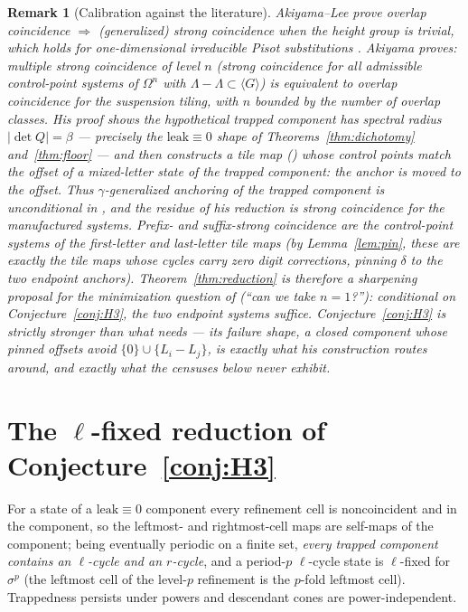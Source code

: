 \documentclass[11pt]{article}
\newtheorem{remark}[theorem]{Remark}
\begin{document}
\begin{remark}[Calibration against the literature]\label{rem:calib}
Akiyama--Lee \cite{AL14} prove overlap coincidence $\Rightarrow$
(generalized) strong coincidence when the height group is trivial,
which holds for one-dimensional irreducible Pisot substitutions
\cite{BK06,Sing06}. Akiyama \cite[Thm.~3.2, Cor.~3.3]{Ak16} proves:
\emph{multiple strong coincidence of level $n$} (strong coincidence for
all admissible control-point systems of $\Omega^n$ with
$\Lambda-\Lambda\subset\langle G\rangle$) is equivalent to overlap
coincidence for the suspension tiling, with $n$ bounded by the number
of overlap classes. His proof shows the hypothetical trapped component
has spectral radius $|\det Q|=\beta$ --- precisely the
$\mathrm{leak}\equiv0$ shape of Theorems~\ref{thm:dichotomy}
and~\ref{thm:floor} --- and then \emph{constructs} a tile map
(\cite[Lem.~3.5]{Ak16}) whose control points match the offset of a
mixed-letter state of the trapped component: the anchor is moved to
the offset. Thus $\gamma$-generalized anchoring of the trapped
component is unconditional in \cite{Ak16}, and the residue of his
reduction is strong coincidence for the manufactured systems.
Prefix- and suffix-strong coincidence are the control-point systems of
the first-letter and last-letter tile maps (by
Lemma~\ref{lem:pin}, these are exactly the tile maps whose cycles carry
zero digit corrections, pinning $\delta$ to the two endpoint anchors).
Theorem~\ref{thm:reduction} is therefore a sharpening proposal for the
minimization question of \cite[Rem.~3.4]{Ak16} (``can we take
$n=1$?''): conditional on Conjecture~\ref{conj:H3}, the two endpoint
systems suffice. Conjecture~\ref{conj:H3} is strictly stronger than
what \cite{Ak16} needs --- its failure shape, a closed component whose
pinned offsets avoid $\{0\}\cup\{L_i-L_j\}$, is exactly what his
construction routes around, and exactly what the censuses below never
exhibit.
\end{remark}

\section{The $\ell$-fixed reduction of Conjecture~\ref{conj:H3}}

For a state of a $\mathrm{leak}\equiv0$ component every refinement cell
is noncoincident and in the component, so the leftmost- and
rightmost-cell maps are self-maps of the component; being eventually
periodic on a finite set, \emph{every trapped component contains an
$\ell$-cycle and an $r$-cycle}, and a period-$p$ $\ell$-cycle state is
$\ell$-fixed for $\sigma^p$ (the leftmost cell of the level-$p$
refinement is the $p$-fold leftmost cell). Trappedness persists under
powers and descendant cones are power-independent.
\end{document}
